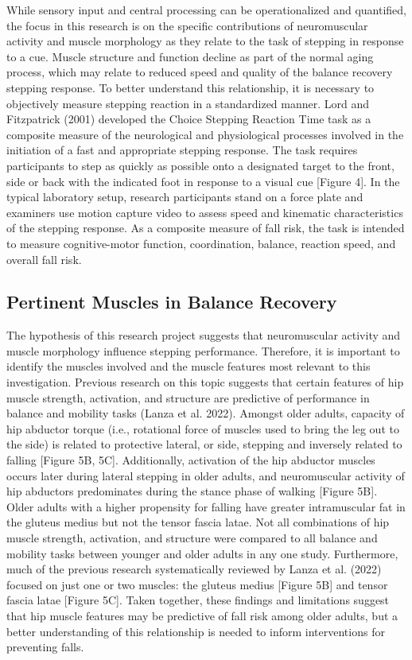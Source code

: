 \documentclass[
  letterpaper,
  DIV=11,
  numbers=noendperiod]{scrartcl}
\begin{document}
While sensory input and central processing can be operationalized and
quantified, the focus in this research is on the specific contributions
of neuromuscular activity and muscle morphology as they relate to the
task of stepping in response to a cue. Muscle structure and function
decline as part of the normal aging process, which may relate to reduced
speed and quality of the balance recovery stepping response. To better
understand this relationship, it is necessary to objectively measure
stepping reaction in a standardized manner. Lord and Fitzpatrick (2001)
developed the Choice Stepping Reaction Time task as a composite measure
of the neurological and physiological processes involved in the
initiation of a fast and appropriate stepping response. The task
requires participants to step as quickly as possible onto a designated
target to the front, side or back with the indicated foot in response to
a visual cue {[}Figure 4{]}. In the typical laboratory setup, research
participants stand on a force plate and examiners use motion capture
video to assess speed and kinematic characteristics of the stepping
response. As a composite measure of fall risk, the task is intended to
measure cognitive-motor function, coordination, balance, reaction speed,
and overall fall risk.

\subsection{Pertinent Muscles in Balance
Recovery}\label{pertinent-muscles-in-balance-recovery}

The hypothesis of this research project suggests that neuromuscular
activity and muscle morphology influence stepping performance.
Therefore, it is important to identify the muscles involved and the
muscle features most relevant to this investigation. Previous research
on this topic suggests that certain features of hip muscle strength,
activation, and structure are predictive of performance in balance and
mobility tasks (Lanza et al. 2022). Amongst older adults, capacity of
hip abductor torque (i.e., rotational force of muscles used to bring the
leg out to the side) is related to protective lateral, or side, stepping
and inversely related to falling {[}Figure 5B, 5C{]}. Additionally,
activation of the hip abductor muscles occurs later during lateral
stepping in older adults, and neuromuscular activity of hip abductors
predominates during the stance phase of walking {[}Figure 5B{]}. Older
adults with a higher propensity for falling have greater intramuscular
fat in the gluteus medius but not the tensor fascia latae. Not all
combinations of hip muscle strength, activation, and structure were
compared to all balance and mobility tasks between younger and older
adults in any one study. Furthermore, much of the previous research
systematically reviewed by Lanza et al. (2022) focused on just one or
two muscles: the gluteus medius {[}Figure 5B{]} and tensor fascia latae
{[}Figure 5C{]}. Taken together, these findings and limitations suggest
that hip muscle features may be predictive of fall risk among older
adults, but a better understanding of this relationship is needed to
inform interventions for preventing falls.
\end{document}
